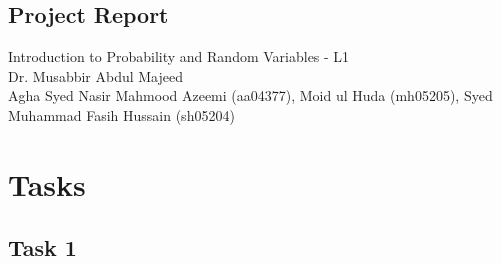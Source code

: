 \documentclass[answers]{exam}
\begin{document}
\setlength{\parskip}{10pt}
\setlength{\parindent}{0pt}
\begin{center}
	\large
	\section*{Project Report}
	Introduction to Probability and Random Variables - L1\\
	Dr. Musabbir Abdul Majeed\\
	Agha Syed Nasir Mahmood Azeemi (aa04377), Moid ul Huda (mh05205), Syed Muhammad Fasih Hussain (sh05204)\\
\end{center}

\section {Tasks}

\subsection {Task 1}
\end{document}

